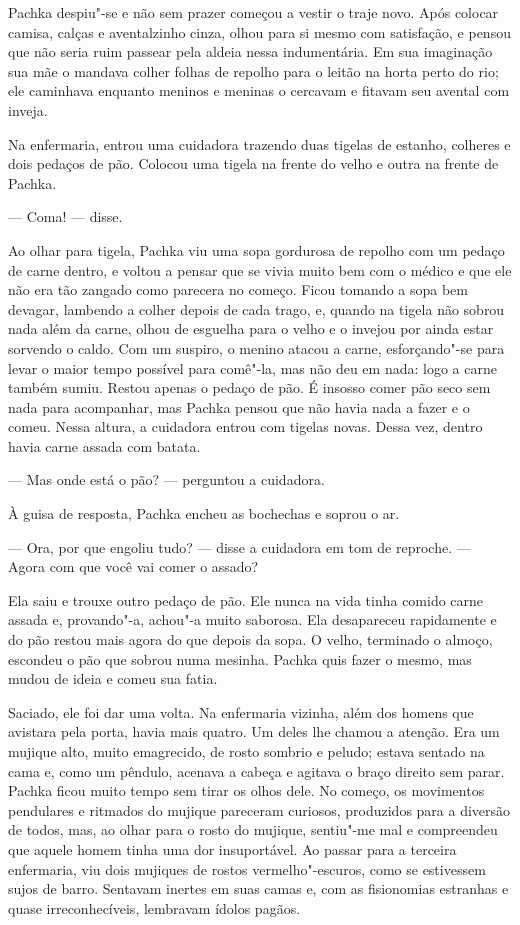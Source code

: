 Pachka despiu"-se e não sem prazer começou a vestir o traje novo. Após
colocar camisa, calças e aventalzinho cinza, olhou para si mesmo com
satisfação, e pensou que não seria ruim passear pela aldeia nessa
indumentária. Em sua imaginação sua mãe o mandava colher folhas de
repolho para o leitão na horta perto do rio; ele caminhava enquanto
meninos e meninas o cercavam e fitavam seu avental com inveja.

Na enfermaria, entrou uma cuidadora trazendo duas tigelas de estanho,
colheres e dois pedaços de pão. Colocou uma tigela na frente do velho e
outra na frente de Pachka.

--- Coma! --- disse.

Ao olhar para tigela, Pachka viu uma sopa gordurosa de repolho com um
pedaço de carne dentro, e voltou a pensar que se vivia muito bem com o
médico e que ele não era tão zangado como parecera no começo. Ficou
tomando a sopa bem devagar, lambendo a colher depois de cada trago, e,
quando na tigela não sobrou nada além da carne, olhou de esguelha para o
velho e o invejou por ainda estar sorvendo o caldo. Com um suspiro, o
menino atacou a carne, esforçando"-se para levar o maior tempo possível
para comê"-la, mas não deu em nada: logo a carne também sumiu. Restou
apenas o pedaço de pão. É insosso comer pão seco sem nada para
acompanhar, mas Pachka pensou que não havia nada a fazer e o comeu.
Nessa altura, a cuidadora entrou com tigelas novas. Dessa vez, dentro
havia carne assada com batata.

--- Mas onde está o pão? --- perguntou a cuidadora.

À guisa de resposta, Pachka encheu as bochechas e soprou o ar.

--- Ora, por que engoliu tudo? --- disse a cuidadora em tom de reproche.
--- Agora com que você vai comer o assado?

Ela saiu e trouxe outro pedaço de pão. Ele nunca na vida tinha comido
carne assada e, provando"-a, achou"-a muito saborosa. Ela desapareceu
rapidamente e do pão restou mais agora do que depois da sopa. O velho,
terminado o almoço, escondeu o pão que sobrou numa mesinha. Pachka quis
fazer o mesmo, mas mudou de ideia e comeu sua fatia.

Saciado, ele foi dar uma volta. Na enfermaria vizinha, além dos homens
que avistara pela porta, havia mais quatro. Um deles lhe chamou a
atenção. Era um mujique alto, muito emagrecido, de rosto sombrio e
peludo; estava sentado na cama e, como um pêndulo, acenava a cabeça e
agitava o braço direito sem parar. Pachka ficou muito tempo sem tirar os
olhos dele. No começo, os movimentos pendulares e ritmados do mujique
pareceram curiosos, produzidos para a diversão de todos, mas, ao olhar
para o rosto do mujique, sentiu"-me mal e compreendeu que aquele homem
tinha uma dor insuportável. Ao passar para a terceira enfermaria, viu
dois mujiques de rostos vermelho"-escuros, como se estivessem sujos de
barro. Sentavam inertes em suas camas e, com as fisionomias estranhas e
quase irreconhecíveis, lembravam ídolos pagãos.

